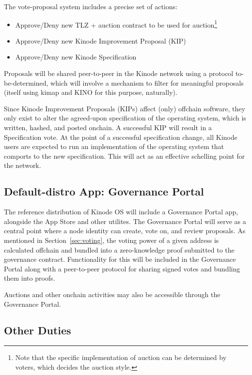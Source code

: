 \documentclass[runningheads]{llncs}
\begin{document}
The vote-proposal system includes a precise set of actions:
\begin{itemize}
    \item Approve/Deny new TLZ + auction contract to be used for auction\footnote{Note that the specific implementation of auction can be determined by voters, which decides the auction style.}
    \item Approve/Deny new Kinode Improvement Proposal (KIP)
    \item Approve/Deny new Kinode Specification
\end{itemize}

Proposals will be shared peer-to-peer in the Kinode network using a protocol to-be-determined, which will involve a mechanism to filter for meaningful proposals (itself using kimap and KINO for this purpose, naturally).

Since Kinode Improvement Proposals (KIPs) affect (only) offchain software, they only exist to alter the agreed-upon specification of the operating system, which is written, hashed, and posted onchain.
A successful KIP will result in a Specification vote.
At the point of a successful specification change, all Kinode users are expected to run an implementation of the operating system that comports to the new specification.
This will act as an effective schelling point for the network.

\subsection{Default-distro App: Governance Portal}
\label{sec:govportal}

The reference distribution of Kinode OS will include a Governance Portal app, alongside the App Store and other utilites.
The Governance Portal will serve as a central point where a node identity can create, vote on, and review proposals.
As mentioned in Section~\ref{sec:voting}, the voting power of a given address is calculated offchain and bundled into a zero-knowledge proof submitted to the governance contract.
Functionality for this will be included in the Governance Portal along with a peer-to-peer protocol for sharing signed votes and bundling them into proofs.

Auctions and other onchain activities may also be accessible through the Governance Portal.

\subsection{Other Duties}
\label{sec:govduties}
\end{document}
